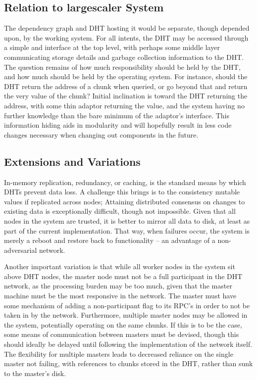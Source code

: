 \subsection{Relation to largescaler System}

The dependency graph and DHT hosting it would be separate, though depended upon, by the working \lsr{} system.
For all intents, the DHT may be accessed through a simple  and  interface at the top level, with perhaps some middle layer communicating storage details and garbage collection information to the DHT.
The question remains of how much responsibility should be held by the DHT, and how much should be held by the operating \lsr{} system.
For instance, should the DHT return the address of a chunk when queried, or go beyond that and return the very value of the chunk?
Initial inclination is toward the DHT returning the address, with some thin adaptor returning the value, and the system having no further knowledge than the bare minimum of the adaptor's interface.
This information hiding aids in modularity and will hopefully result in less code changes necessary when changing out components in the future\cite{gamma1995design}.

\subsection{Extensions and Variations}

In-memory replication, redundancy, or caching, is the standard means by which DHTs prevent data loss.
A challenge this brings is to the consistency mutable values if replicated across nodes; Attaining distributed consensus on changes to existing data is exceptionally difficult, though not impossible\cite{brewer1999cap}\cite{gilbert2002brewer}.
Given that all nodes in the system are trusted, it is better to mirror all data to disk, at least as part of the current implementation.
That way, when failures occur, the system is merely a reboot and restore back to functionality -- an advantage of a non-adversarial network.

Another important variation is that while all worker nodes in the system sit above DHT nodes, the master node must not be a full participant in the DHT network, as the processing burden may be too much, given that the master machine must be the most responsive in the network.
The master must have some mechanism of adding a non-participant flag to its RPC's in order to not be taken in by the network.
Furthermore, multiple master nodes may be allowed in the system, potentially operating on the same chunks.
If this is to be the case, some means of communication between masters must be devised, though this should ideally be delayed until following the implementation of the network itself.
The flexibility for multiple masters leads to decreased reliance on the single master not failing, with references to chunks stored in the DHT, rather than sunk to the master's disk.

